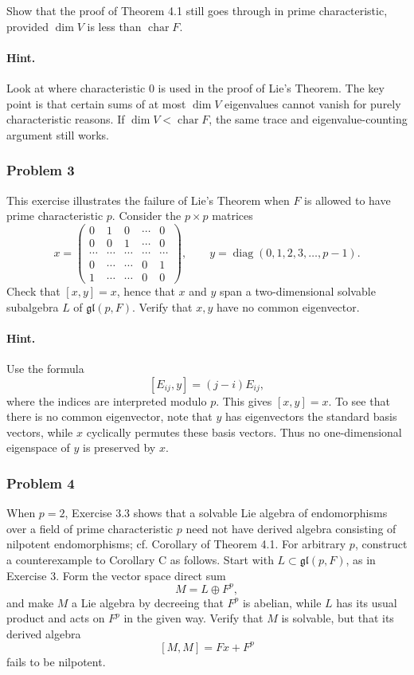 \documentclass[12pt, a4paper]{article}
\begin{document}
Show that the proof of Theorem 4.1 still goes through in prime characteristic,
provided \(\dim V\) is less than \(\operatorname{char} F\).

\paragraph{Hint.}
Look at where characteristic \(0\) is used in the proof of Lie's Theorem. The
key point is that certain sums of at most \(\dim V\) eigenvalues cannot vanish
for purely characteristic reasons. If \(\dim V<\operatorname{char}F\), the same
trace and eigenvalue-counting argument still works.

\subsubsection{Problem 3}

This exercise illustrates the failure of Lie's Theorem when \(F\) is allowed to
have prime characteristic \(p\). Consider the \(p\times p\) matrices
\[
x=
\begin{pmatrix}
0&1&0&\cdots&0\\
0&0&1&\cdots&0\\
\cdots&\cdots&\cdots&\cdots&\cdots\\
0&\cdots&\cdots&0&1\\
1&\cdots&\cdots&0&0
\end{pmatrix},
\qquad
y=\operatorname{diag}(0,1,2,3,\ldots,p-1).
\]
Check that \([x,y]=x\), hence that \(x\) and \(y\) span a two-dimensional
solvable subalgebra \(L\) of \(\mathfrak{gl}(p,F)\). Verify that \(x,y\) have
no common eigenvector.

\paragraph{Hint.}
Use the formula
\[
[E_{ij},y]=(j-i)E_{ij},
\]
where the indices are interpreted modulo \(p\). This gives \([x,y]=x\). To see
that there is no common eigenvector, note that \(y\) has eigenvectors the
standard basis vectors, while \(x\) cyclically permutes these basis vectors.
Thus no one-dimensional eigenspace of \(y\) is preserved by \(x\).

\subsubsection{Problem 4}

When \(p=2\), Exercise 3.3 shows that a solvable Lie algebra of endomorphisms
over a field of prime characteristic \(p\) need not have derived algebra
consisting of nilpotent endomorphisms; cf. Corollary of Theorem 4.1. For
arbitrary \(p\), construct a counterexample to Corollary C as follows. Start
with \(L\subset \mathfrak{gl}(p,F)\), as in Exercise 3. Form the vector space
direct sum
\[
M=L\oplus F^p,
\]
and make \(M\) a Lie algebra by decreeing that \(F^p\) is abelian, while \(L\)
has its usual product and acts on \(F^p\) in the given way. Verify that \(M\) is
solvable, but that its derived algebra
\[
[M,M]=Fx+F^p
\]
fails to be nilpotent.
\end{document}

